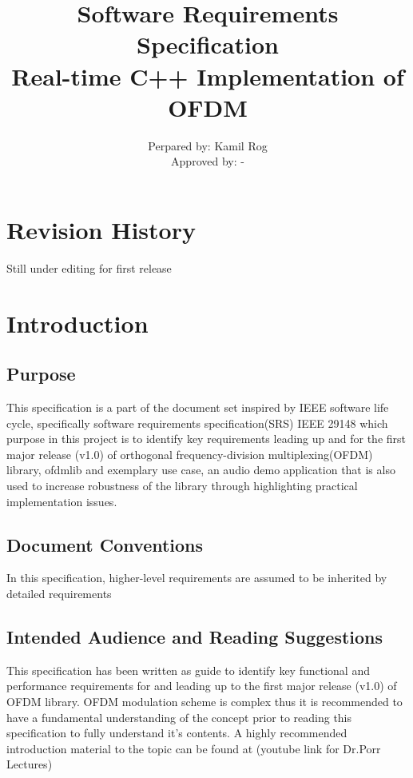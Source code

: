 \documentclass[]{report}
\title{ Software Requirements Specification \\ Real-time C++ Implementation of OFDM}
\author{Perpared by: Kamil Rog \\ Approved by: - }
\begin{document}
\maketitle

\pagebreak

\section*{Revision History}
Still under editing for first release
\pagebreak

\tableofcontents
\thispagestyle{empty}
\pagebreak

\cleardoublepage
{}

\pagebreak

\renewcommand{\thesection}{\arabic{section}}

\setlength{\parindent}{0em}
\setlength{\parskip}{0em}

\section{Introduction}

\subsection{Purpose}

This specification is a part of the document set inspired by IEEE software life cycle, specifically software requirements specification(SRS) IEEE 29148 which purpose in this project is to identify key requirements leading up and for the first major release (v1.0) of orthogonal frequency-division multiplexing(OFDM) library, ofdmlib and exemplary use case, an audio demo application that is also used to increase robustness of the library through highlighting practical implementation issues.


\subsection{Document Conventions}

In this specification, higher-level requirements are assumed to be inherited by detailed requirements


\subsection{Intended Audience and Reading Suggestions}

This specification has been written as guide to identify key functional and performance requirements for and leading up to the first major release (v1.0) of OFDM library. OFDM modulation scheme is complex thus it is recommended to have a fundamental understanding of the concept prior to reading this specification to fully understand it's contents. A highly recommended introduction material to the topic can be found at (youtube link for Dr.Porr Lectures)
\end{document}
